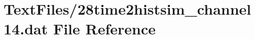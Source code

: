 \hypertarget{28time2histsim__channel14_8dat}{}\section{Text\+Files/28time2histsim\+\_\+channel14.dat File Reference}
\label{28time2histsim__channel14_8dat}
